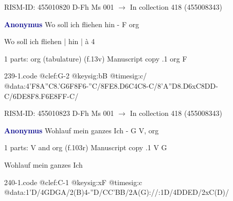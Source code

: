 \documentclass[twocolumn]{book}
\begin{document}
\newline RISM-ID: 455010820
\newline D-Fh  Ms 001
\newline $\rightarrow$ In collection 418 (455008343)
      
\newline \par \vspace{7pt} \textcolor{darkblue}{\textbf{Anonymus  }}
\newline Wo soll ich fliehen hin - F
\newline org
\newline \begin{itshape}[f.13v, at left:] Wo soll ich fliehen | hin | à 4\end{itshape} 
\newline \textcolor{darkblue}{}  1 parts: org (tabulature)  (f.13v)
\newline Manuscript copy
.1  org  F  
\begin{filecontents*}{239-1.code}
@clef:G-2
@keysig:bB
@timesig:c/
@data:4'F{8A''C}{8.'G6F}8F6-''C/{8FE8.D6C}4C8-C/{8'A''D8.D6xC}{8DD}-C/{6DE8F8.F6E}{8FF}-C/
\end{filecontents*}
\newline
%

\newline RISM-ID: 455010823
\newline D-Fh  Ms 001
\newline $\rightarrow$ In collection 418 (455008343)
      
\newline \par \vspace{7pt} \textcolor{darkblue}{\textbf{Anonymus  }}
\newline Wohlauf mein ganzes Ich - G
\newline V, org
\newline \begin{itshape}\end{itshape} 
\newline \textcolor{darkblue}{}  1 parts: V and org  (f.103r)
\newline Manuscript copy
.1  V  G
\newline \begin{footnotesize} Wohlauf mein ganzes Ich \end{footnotesize}  
\begin{filecontents*}{240-1.code}
@clef:C-1
@keysig:xF
@timesig:c
@data:1'D/4GDGA/2(B)4-''D/CC'BB/2A(G)://:1D/4DDED/2xC(D)/
\end{filecontents*}
\newline
%
\end{document}
